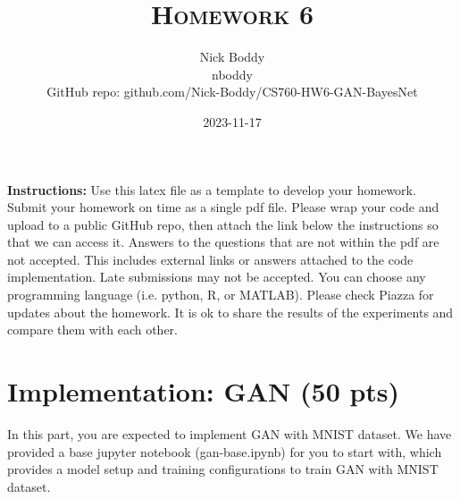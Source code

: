 \documentclass[a4paper]{article}
\title{\textsc{Homework 6}} %
\author{
	Nick Boddy \\
	nboddy \\
	GitHub repo: github.com/Nick-Boddy/CS760-HW6-GAN-BayesNet \\
}
\date{2023-11-17}
\theoremstyle{definition}
\begin{document}
	
	\maketitle 
	
        \textbf{Instructions:}
        Use this latex file as a template to develop your homework. Submit your homework on time as a single pdf file. Please wrap your code and upload to a public GitHub repo, then attach the link below the instructions so that we can access it. Answers to the questions that are not within the pdf are not accepted. This includes external links or answers attached to the code implementation. Late submissions may not be accepted. You can choose any programming language (i.e. python, R, or MATLAB). Please check Piazza for updates about the homework. It is ok to share the results of the experiments and compare them with each other.
        \vspace{0.1in}
	
	\section{Implementation: GAN (50 pts)}
	In this part, you are expected to implement GAN with MNIST dataset. We have provided a base jupyter notebook (gan-base.ipynb) for you to start with, which provides a model setup and training configurations to train GAN with MNIST dataset.
	
\end{document}

